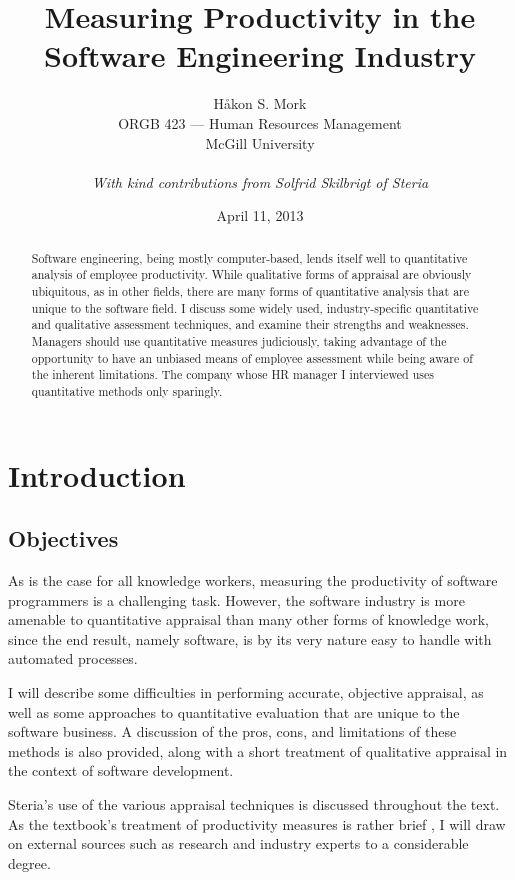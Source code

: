\documentclass[letterpaper, 12pt]{report}
\title{\Huge \textbf{Measuring Productivity in the Software Engineering Industry}}
\author{
	Håkon S. Mork \\ 
	ORGB 423 --- Human Resources Management \\ 
	McGill University \\
	\\
	\emph{With kind contributions from Solfrid Skilbrigt of Steria}
}
\date{April 11, 2013}
\begin{document}
\maketitle

\pagebreak[4] 
\thispagestyle{empty}
\null
\pagebreak[4]

\begin{abstract}
Software engineering, being mostly computer-based, lends itself well to quantitative analysis of employee productivity. 
While qualitative forms of appraisal are obviously ubiquitous, as in other fields, there are many forms of quantitative analysis that are unique to the software field.
I discuss some widely used, industry-specific quantitative and qualitative assessment techniques, and examine their strengths and weaknesses.
Managers should use quantitative measures judiciously, taking advantage of the opportunity to have an unbiased means of employee assessment while being aware of the inherent limitations. 
The company whose HR manager I interviewed uses quantitative methods only sparingly.
\end{abstract}

\tableofcontents




\chapter{Introduction}

\section{Objectives}
As is the case for all knowledge workers, measuring the productivity of software programmers is a challenging task.
However, the software industry is more amenable to quantitative appraisal than many other forms of knowledge work, since the end result, namely software, is by its very nature easy to handle with automated processes. 

I will describe some difficulties in performing accurate, objective appraisal, as well as some approaches to quantitative evaluation that are unique to the software business.
A discussion of the pros, cons, and limitations of these methods is also provided, along with a short treatment of qualitative appraisal in the context of software development. 

Steria's use of the various appraisal techniques is discussed throughout the text. 
As the textbook's treatment of productivity measures is rather brief \parencite[][374]{textbook}, I will draw on external sources such as research and industry experts to a considerable degree.
\end{document}
